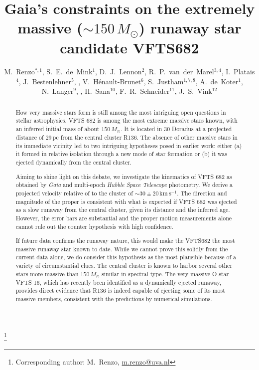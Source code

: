 \documentclass[apjl,twocolumn]{emulateapj}
\newcommand{\SdM}[1]{{{\color{brown}{#1}}}}
\newcommand{\kms}{{\,\mathrm{km\ s^{-1}}}}
\begin{document}
\title{Gaia's constraints on the extremely massive  ($\sim$$150\,M_\odot$) runaway star candidate VFTS682}

\author{M.~Renzo$^{*,1}$, S.~E.~de~Mink$^{1}$, D.~J.~Lennon$^{2}$,
  R.~P.~van~der~Marel$^{3,4}$, I.~Platais$^{4}$, 
  J.~Bestenlehner$^{5}$, \SdM{C.~J.~Evans$^{X}$},
  V.~H\'enault-Brunet$^{6}$,  S.~Justham$^{1,7,8}$,  A.~de~Koter$^{1}$,
  N.~Langer$^{9}$,  \SdM{F. Najarro$^{X}$}, H.~Sana$^{10}$, F.~R.~Schneider$^{11}$, J.~S.~Vink$^{12}$}

 \thanks{Corresponding author:  M.~Renzo, \href{mailto:m.renzo@uva.nl}{m.renzo@uva.nl}}
\begin{abstract}
 
 How very massive stars form is still among the most intriguing open  questions in stellar astrophysics.  VFTS 682 is among the most  extreme massive stars known, with an inferred initial mass of about  $150\,M_\odot$. It is located in 30 Doradus at a projected distance of 29\,pc from the central cluster R136.  The absence of other massive stars in its immediate vicinity led to two intriguing hypotheses posed in earlier work: either (a) it formed in relative isolation through a new mode of star formation or (b) it was ejected dynamically from the central cluster. 
 
Aiming to shine light on this debate, we investigate the kinematics of  VFTS 682 as obtained by \emph{Gaia} and multi-epoch \emph{Hubble Space Telescope} photometry.    We derive a projected velocity relative of to the cluster of $\sim$$30\pm20\kms$.  The direction and magnitude of the proper is consistent with what is expected if VFTS 682 was ejected as a slow runaway from the central cluster, given its distance and the inferred age.  However, the error bars are substantial and the proper motion measurements alone cannot rule out the counter hypothesis with high confidence.   
 
If future data confirms the runaway nature, this would make the VFTS682 the most massive runaway star known to date.  While we cannot prove this solidly from the current data alone, we do consider this hypothesis as the most plausible because of a variety of circumstantial clues. The central cluster is known to harbor several other stars more massive than $150\,M_\odot$ similar in spectral type.  The very massive O star VFTS 16, which has recently been identified as a dynamically ejected runaway, provides direct evidence that R136 is indeed capable of ejecting some of its most massive members, consistent with the predictions by numerical simulations.
\end{abstract}
\end{document}

